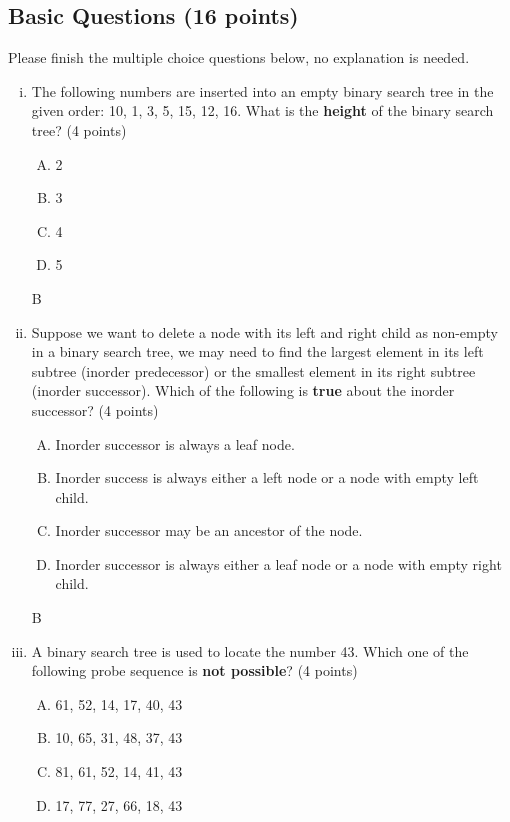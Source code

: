 \documentclass[11pt]{exam}
\begin{document}
\subsection{Basic Questions (16 points)}
Please finish the multiple choice questions below, no explanation is needed.
\begin{enumerate}[i)]
    \item The following numbers are inserted into an empty binary search tree in the given order: 10, 1, 3, 5, 15, 12, 16. What is the \textbf{height} of the binary search tree? (4 points)
          \begin{enumerate}[A.]
              \item 2
              \item 3
              \item 4
              \item 5
          \end{enumerate}

          \begin{solution}
              B
          \end{solution}

    \item Suppose we want to delete a node with its left and right child as non-empty in a binary search tree, we may need to find the largest element in its left subtree (inorder predecessor) or the smallest element in its right subtree (inorder successor). Which of the following is \textbf{true} about the inorder successor? (4 points)
          \begin{enumerate}[A.]
              \item Inorder successor is always a leaf node.
              \item Inorder success is always either a left node or a node with empty left child.
              \item Inorder successor may be an ancestor of the node.
              \item Inorder successor is always either a leaf node or a node with empty right child.
          \end{enumerate}

          \begin{solution}
              B
          \end{solution}

    \item A binary search tree is used to locate the number 43. Which one of the following probe sequence is \textbf{not possible}? (4 points)
          \begin{enumerate}[A.]
              \item 61, 52, 14, 17, 40, 43
              \item 10, 65, 31, 48, 37, 43
              \item 81, 61, 52, 14, 41, 43
              \item 17, 77, 27, 66, 18, 43
          \end{enumerate}


\end{enumerate}
\end{document}
